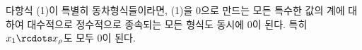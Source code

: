 
다항식 (1)이 특별히 동차형식들이라면, (1)을 0으로 만드는 모든 특수한 값의 계에 대하여 대수적으로 정수적으로 종속되는 모든 형식도 동시에 0이 된다. 특히 $x_1\rcdots x_\rho$도 모두 0이 된다.
